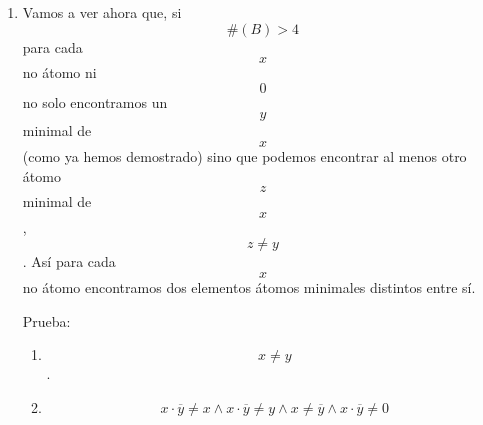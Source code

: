 \begin{enumerate}
\begin{enumerate}
\begin{enumerate}
\begin{enumerate}
        \[1\] es el uno.
      \item
        \[\forall{z \in \left\lbrack {1,x} \right\rbrack_{B}}{{1 \cdot z} = z}\]

        Definimos un nuevo complementario.
      \item
        \[\forall{z \in \left\lbrack {1,x} \right\rbrack_{B}}{{z'} ≝ {x + \overline{z}}}\]

        Es interno.
      \item
        \[\forall{z \in \left\lbrack {1,x} \right\rbrack_{B}}{{z'} \geq x}\]
      \item
        \[\forall{z \in \left\lbrack {1,x} \right\rbrack_{B}}{{z'} \in \left\lbrack {1,x} \right\rbrack_{B}}\]

        Hace lo que tiene que hacer un complementario.
      \item
        \[\forall{z \in \left\lbrack {1,x} \right\rbrack_{B}}{{{{{{z'} \cdot z} = {{({x + \overline{z}})} \cdot z}} = {{({x \cdot z})} + {({\overline{z} \cdot z})}}} = {x \cdot z}} = x}\]
      \item
        \[\forall{z \in \left\lbrack {1,x} \right\rbrack_{B}}{{{{{z'} + z} = {{x + \overline{z}} + z}} = {x + 1}} = 1}\]

        Aplicamos la existencia de elementos hiperátomos y que \[x\] no
        lo es.
      \item
        \[{x \notin \mathit{Htom}}{(B)}\Rightarrow{\left( {1,x} \right)_{B} \neq \varnothing}\]
      \item
        \[\exists{y \in \mathit{Htom}}{(\left\lbrack {1,x} \right\rbrack_{B})}\]
      \item
        \[y \geq x\]
      \end{enumerate}
    \item
      Vamos a ver ahora que, si \[{\#{(B)}} > 4\] para cada \[x\] no
      átomo ni \[0\] no solo encontramos un \[y\] minimal de \[x\](como
      ya hemos demostrado) sino que podemos encontrar al menos otro
      átomo \[z\] minimal de \[x\], \[z \neq y\]. Así para cada \[x\] no
      átomo encontramos dos elementos átomos minimales distintos entre
      sí.

      Prueba:

      \begin{enumerate}
      \def\labelenumiv{\arabic{enumiv}.}
      \item
        \[x \neq y\].
      \item
        \[{{{{x \cdot \overline{y}} \neq {{x \land x} \cdot \overline{y}}} \neq {y \land x}} \neq {{\overline{y} \land x} \cdot \overline{y}}} \neq 0\]


\end{enumerate}
\end{enumerate}
\end{enumerate}
\end{enumerate}
